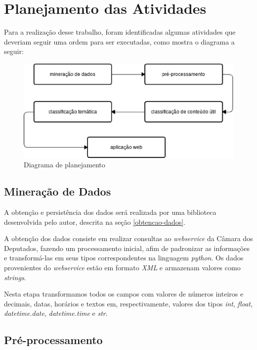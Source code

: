 \section{Planejamento das Atividades}

Para a realização desse trabalho, foram identificadas algumas atividades que deveriam seguir uma ordem para ser executadas, como mostra o diagrama a seguir:

\begin{figure}[h]
    \centering
    \includegraphics[scale=0.5]{figuras/planejamento.eps}
    \caption{Diagrama de planejamento}
\end{figure}

\subsection{Mineração de Dados}

A obtenção e persistência dos dados será realizada por uma biblioteca desenvolvida pelo autor, descrita na seção \ref{obtencao-dados}.

A obtenção dos dados consiste em realizar consultas ao \textit{webservice} da Câmara dos Deputados, fazendo um processamento inicial, afim de padronizar as informações e transformá-las em seus tipos correspondentes na linguagem \textit{python}. Os dados provenientes do \textit{webservice} estão em formato \textit{XML} e armazenam valores como \textit{strings}.

Nesta etapa transformamos todos os campos com valores de números inteiros e decimais, datas, horários e textos em, respectivamente, valores dos tipos \textit{int}, \textit{float}, \textit{datetime.date}, \textit{datetime.time} e \textit{str}.

\subsection{Pré-processamento}

